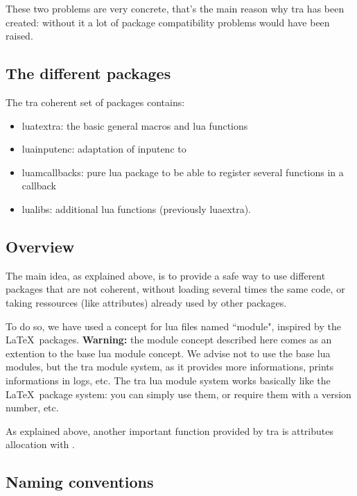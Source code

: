 \documentclass{article}
\begin{document}
These two problems are very concrete, that's the main reason why \LuaTeX tra
has been created: without it a lot of package compatibility problems would
have been raised.

\subsection{The different packages}

The \LuaTeX tra coherent set of packages contains:

\begin{itemize}
  \item \textsf{luatextra}: the basic general macros and lua functions
  \item \textsf{luainputenc}: adaptation of \textsf{inputenc} to \LuaTeX
  \item \textsf{luamcallbacks}: pure lua package to be able to register
    several functions in a callback
  \item \textsf{lualibs}: additional lua functions (previously
    \textsf{luaextra}).
\end{itemize}

\subsection{Overview}

The main idea, as explained above, is to provide a safe way to use different
packages that are not coherent, without loading several times the same code,
or taking ressources (like attributes) already used by other packages.

To do so, we have used a concept for lua files named ``module", inspired by
the \LaTeX\ packages. \textbf{Warning:} the module concept described here
comes as an extention to the base lua module concept. We advise not to use the
base lua modules, but the \LuaTeX tra module system, as it provides more
informations, prints informations in logs, etc. The \LuaTeX tra lua module
system works basically like the \LaTeX\ package system: you can simply use
them, or require them with a version number, etc.

As explained above, another important function provided by \LuaTeX tra is
attributes allocation with \texttt{\string\newluaattribute}.

\subsection{Naming conventions}
\end{document}
